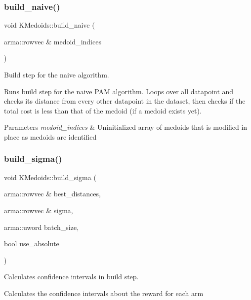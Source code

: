 \subsubsection{\texorpdfstring{build\+\_\+naive()}{build\_naive()}}
{\footnotesize\ttfamily void K\+Medoids\+::build\+\_\+naive (\begin{DoxyParamCaption}\item[{arma\+::rowvec \&}]{medoid\+\_\+indices }\end{DoxyParamCaption})\hspace{0.3cm}{\ttfamily [private]}}



Build step for the naive algorithm. 

Runs build step for the naive P\+AM algorithm. Loops over all datapoint and checks its distance from every other datapoint in the dataset, then checks if the total cost is less than that of the medoid (if a medoid exists yet).


\begin{DoxyParams}{Parameters}
{\em medoid\+\_\+indices} & Uninitialized array of medoids that is modified in place as medoids are identified \\
\hline
\end{DoxyParams}
\mbox{\label{classKMedoids_aa655c4a1d55d8d49be343f3d6d62a0c2}} 
\subsubsection{\texorpdfstring{build\+\_\+sigma()}{build\_sigma()}}
{\footnotesize\ttfamily void K\+Medoids\+::build\+\_\+sigma (\begin{DoxyParamCaption}\item[{arma\+::rowvec \&}]{best\+\_\+distances,  }\item[{arma\+::rowvec \&}]{sigma,  }\item[{arma\+::uword}]{batch\+\_\+size,  }\item[{bool}]{use\+\_\+absolute }\end{DoxyParamCaption})\hspace{0.3cm}{\ttfamily [private]}}



Calculates confidence intervals in build step. 

Calculates the confidence intervals about the reward for each arm


